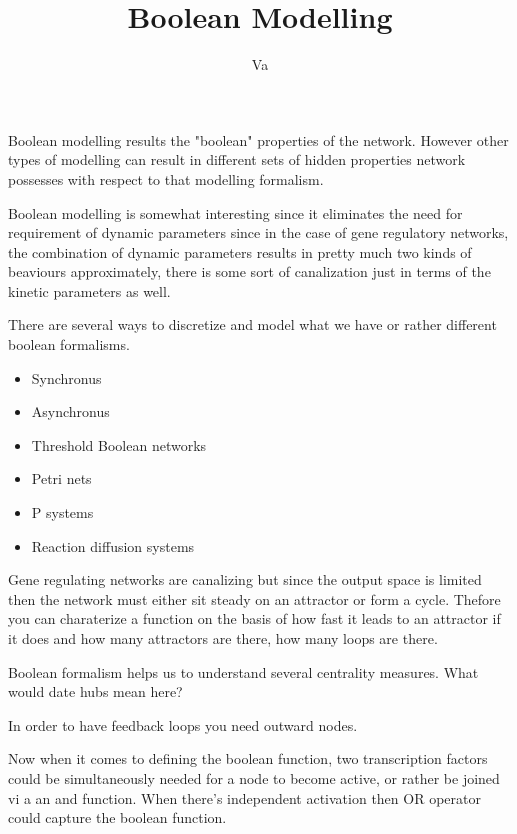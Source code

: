 \documentclass{article}
\title{Boolean Modelling}
\author{Va}
\begin{document}
\maketitle


Boolean modelling results the "boolean" properties of the network. However other types of modelling can result in different sets of hidden properties network possesses with respect to that modelling formalism. 

Boolean modelling is somewhat interesting since it eliminates the need for requirement of dynamic parameters since in the case of gene regulatory networks, the combination of dynamic parameters results in pretty much two kinds of beaviours approximately, there is some sort of canalization just in terms of the kinetic parameters as well. 

There are several ways to discretize and model what we have or rather different boolean formalisms. 

\begin{itemize}

\item Synchronus 

\item Asynchronus 

\item Threshold Boolean networks 

\item Petri nets 

\item P systems 

\item Reaction diffusion systems 

\end{itemize}

Gene regulating networks are canalizing but since the output space is limited then the network must either sit steady on an attractor or form a cycle. Thefore you can charaterize a function on the basis of how fast it leads to an attractor if it does and how many attractors are there, how many loops are there. 


Boolean formalism helps us to understand several centrality measures. What would date hubs mean here?

In order to have feedback loops you need outward nodes. 


Now when it comes to defining the boolean function, two transcription factors could be simultaneously needed for a node to become active, or rather be joined vi a an and function. When there's independent activation then OR operator could capture the boolean function.
\end{document}
